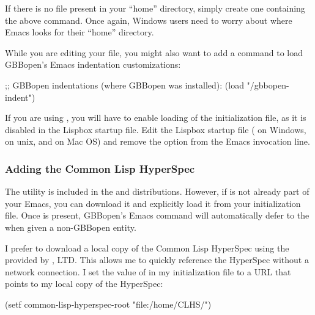 \documentclass[10pt,twoside,english,pdftex]{article}
\begin{document}
If there is no  file present in your ``home'' directory, simply
create one containing the above command. Once again, Windows users need to
worry about where Emacs looks for their ``home'' directory.

While you are editing your  file, you might also want to add a
command to load GBBopen's Emacs indentation customizations:
%
\begin{example}
  ;; GBBopen indentations (where GBBopen was installed):
  (load "/gbbopen-indent")
\end{example}

If you are using
, you
will have to enable loading of the  initialization file, as it is
disabled in the Lispbox startup file.  Edit the Lispbox startup file
( on Windows,  on unix, and
 on Mac OS)
and remove the  option from the Emacs invocation line.

\subsubsection*{Adding the Common Lisp HyperSpec}

The
utility is included in the
 and
 distributions.
However, if  is not already part of your Emacs, you can
download it and explicitly load it from your  initialization file.
Once  is present, GBBopen's  Emacs
command will automatically defer to the  when given a
non-GBBopen entity.  

I prefer to download a local copy of the Common Lisp HyperSpec using the
provided by , LTD.  This allows
me to quickly reference the HyperSpec without a network connection.  I set the
value of  in my  initialization
file to a URL that points to my local copy of the HyperSpec:
%
\begin{example}
  (setf common-lisp-hyperspec-root "file:/home/CLHS/")
\end{example}
\end{document}
